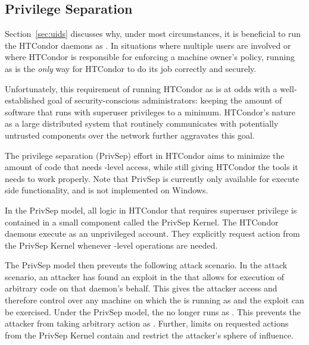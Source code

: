 \subsection{\label{sec:PrivSep}Privilege Separation}

Section~\ref{sec:uids} discusses why, under most circumstances, it is
beneficial to run the HTCondor daemons as . In situations
where multiple users are involved or where HTCondor is responsible for
enforcing a machine owner's policy, running as  is the 
\emph{only} way for HTCondor to do its job correctly and securely.

Unfortunately, this requirement of running HTCondor as  is
at odds with a well-established goal of security-conscious
administrators: keeping the amount of software that runs with
superuser privileges to a minimum. HTCondor's nature as a
large distributed system that routinely communicates with potentially
untrusted components over the network further aggravates this goal.

The privilege separation (PrivSep) effort in HTCondor aims to minimize
the amount of code that needs -level access, while still
giving HTCondor the tools it needs to work properly. Note that PrivSep
is currently only available for execute side functionality, and is not
implemented on Windows.

In the PrivSep model, all logic in HTCondor that requires superuser
privilege is contained in a small component called 
the PrivSep Kernel.
The HTCondor daemons execute as an unprivileged account.
They explicitly request action from the PrivSep Kernel whenever
-level operations are needed.

The PrivSep model then prevents the following attack scenario.
In the attack scenario, an attacker has found an exploit in the
 that allows for execution of arbitrary code on that
daemon's behalf. 
This gives the attacker  access and therefore
control over any machine
on which the  is running as 
and the exploit can be exercised.
Under the PrivSep model,
the  no longer runs as .
This prevents the attacker from taking arbitrary action as . 
Further, limits on requested actions from the PrivSep Kernel
contain and restrict the attacker's sphere of influence.

